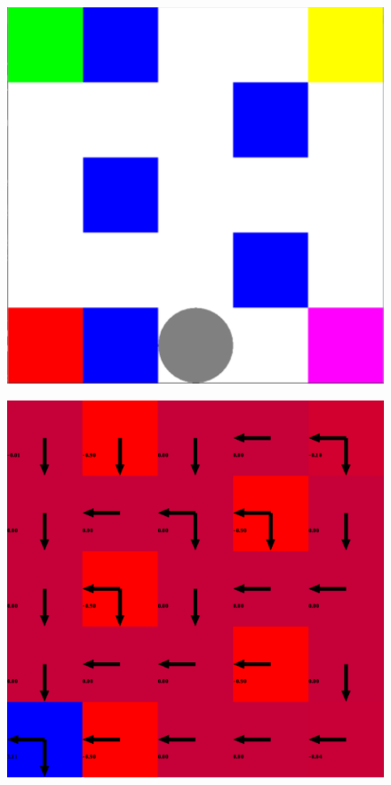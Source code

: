 \begin{figure}
\centering
\begin{minipage}{0.22\textwidth}
\includegraphics[width=1\columnwidth]{../2015_grant/figures/traj2_1.pdf}
\label{fig:puddle-grid}
\end{minipage}%
%
\hspace{0.033\textwidth}
%
\begin{minipage}{0.22\textwidth}
\includegraphics[width=1\columnwidth]{../2015_grant/figures/plus1plus1.pdf}

\end{minipage}
\end{figure}
